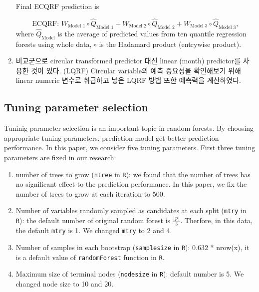 \documentclass[11pt,titlepage]{article}
\begin{document}
\begin{enumerate}
		Final ECQRF prediction is
		
		$$\text{ECQRF: }W_{\text{Model 1}}\circ \hat{Q}_{\text{Model 1}}+W_{\text{Model 2}}\circ \hat{Q}_{\text{Model 2}}+W_{\text{Model 3}}\circ \hat{Q}_{\text{Model 3}},$$
		where %
		$\hat{Q}_{\text{Model}}$ is the average of predicted values from ten quantile regression forests using whole data, $\circ$ is the Hadamard product (entrywise product). %
		\item 비교군으로 circular transformed predictor 대신 linear (month) predictor를 사용한 것이 있다. (LQRF) Circular variable의 예측 중요성을 확인해보기 위해 linear numeric 변수로 취급하고 넣은 LQRF 방법 또한 예측력을 계산하였다.
	\end{enumerate}

	\subsection{Tuning parameter selection}
	
	Tuninig parameter selection is an important topic in random forests. By choosing appropriate tuning parameters, prediction model get better prediction performance. In this paper, we consider five tuning parameters. First three tuning parameters are fixed in our research:
	
	\begin{enumerate}
		\item number of trees to grow (\texttt{ntree} in \texttt{R}): we found that the number of trees has no significant effect to the prediction performance. In this paper, we fix the number of trees to grow at each iteration to 500.
		\item Number of variables randomly sampled as candidates at each split (\texttt{mtry} in \texttt{R}): the default number of original random forest is $\frac{\lfloor p \rfloor}{3}$. Therfore, in this data, the default \texttt{mtry} is 1. We changed \texttt{mtry} to 2 and 4.
		\item Number of samples in each bootstrap (\texttt{samplesize} in \texttt{R}): 0.632 * nrow(x), it is a default value of \texttt{randomForest} function in \texttt{R}. \citep{Efron1997}
		\item Maximum size of terminal nodes (\texttt{nodesize} in \texttt{R}): default number is 5. We changed node size to 10 and 20.
	\end{enumerate}
\end{document}

